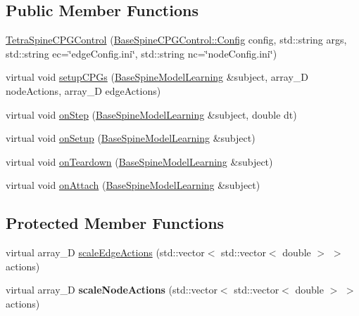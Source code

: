 \subsection*{Public Member Functions}
\begin{DoxyCompactItemize}
\item 
\hyperlink{class_tetra_spine_c_p_g_control_a8b389fc0844f31568b3f115d0c6ff80e}{Tetra\-Spine\-C\-P\-G\-Control} (\hyperlink{struct_base_spine_c_p_g_control_1_1_config}{Base\-Spine\-C\-P\-G\-Control\-::\-Config} config, std\-::string args, std\-::string ec=\char`\"{}edge\-Config.\-ini\char`\"{}, std\-::string nc=\char`\"{}node\-Config.\-ini\char`\"{})
\item 
virtual void \hyperlink{class_tetra_spine_c_p_g_control_a1011f7ba6c6df843b8a7d3bd64f75ac5}{setup\-C\-P\-Gs} (\hyperlink{class_base_spine_model_learning}{Base\-Spine\-Model\-Learning} \&subject, array\-\_\-D node\-Actions, array\-\_\-D edge\-Actions)
\item 
virtual void \hyperlink{class_base_spine_c_p_g_control_afa0b0e1f995545476511eac4fd322da2}{on\-Step} (\hyperlink{class_base_spine_model_learning}{Base\-Spine\-Model\-Learning} \&subject, double dt)
\item 
virtual void \hyperlink{class_base_spine_c_p_g_control_a25508234dbe960a6fea460d2abd6f353}{on\-Setup} (\hyperlink{class_base_spine_model_learning}{Base\-Spine\-Model\-Learning} \&subject)
\item 
virtual void \hyperlink{class_base_spine_c_p_g_control_aa209e0699b3dfc5889c6084409be4d20}{on\-Teardown} (\hyperlink{class_base_spine_model_learning}{Base\-Spine\-Model\-Learning} \&subject)
\item 
virtual void \hyperlink{classtg_observer_a0ecd07483eb41f9a0ab19b8ed24052f1}{on\-Attach} (\hyperlink{class_base_spine_model_learning}{Base\-Spine\-Model\-Learning} \&subject)
\end{DoxyCompactItemize}
\subsection*{Protected Member Functions}
\begin{DoxyCompactItemize}
\item 
virtual array\-\_\-D \hyperlink{class_base_spine_c_p_g_control_afe859425b72dcacf780647676571045b}{scale\-Edge\-Actions} (std\-::vector$<$ std\-::vector$<$ double $>$ $>$ actions)
\item 
\hypertarget{class_base_spine_c_p_g_control_a69503b94c6783d03efcfc962c4dc8c92}{virtual array\-\_\-D {\bfseries scale\-Node\-Actions} (std\-::vector$<$ std\-::vector$<$ double $>$ $>$ actions)}\label{class_base_spine_c_p_g_control_a69503b94c6783d03efcfc962c4dc8c92}

\end{DoxyCompactItemize}
